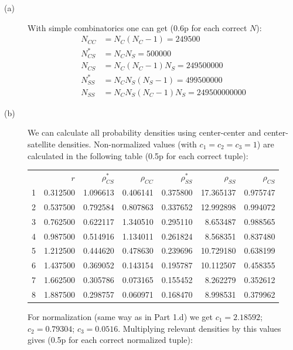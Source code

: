 \begin{description}
\item[(a)] With simple combinatorics one can get (0.6p for each correct
  $N$):
  \begin{align*}
  N_{CC} &= N_C(N_C - 1) = 249500\\
  N^{*}_{CS} &= N_C N_S = 500000\\
  N_{CS} &= N_C(N_C - 1)N_S = 249500000\\
  N^{*}_{SS} &= N_C N_S(N_S - 1) = 499500000\\
  N_{SS} &= N_C N_S(N_C - 1)N_S = 249500000000
  \end{align*}

\item[(b)] We can calculate all probability densities using
  center-center and center-satellite densities. Non-normalized values
  (with $c_1 = c_2 = c_3 = 1$) are calculated in the following table
  (0.5p for each correct tuple):

  \begin{center}
  \begin{tabular}{rrrrrrr}
  & $r$ & $\rho^{*}_{CS}$ & $\rho_{CC}$ & $\rho^{*}_{SS}$
    & $\rho_{SS}$ & $\rho_{CS}$\\
  1 & 0.312500 & 1.096613 & 0.406141 & 0.375800 & 17.365137 & 0.975747\\
  2 & 0.537500 & 0.792584 & 0.807863 & 0.337652 & 12.992898 & 0.994072\\
  3 & 0.762500 & 0.622117 & 1.340510 & 0.295110 & 8.653487 & 0.988565\\
  4 & 0.987500 & 0.514916 & 1.134011 & 0.261824 & 8.568351 & 0.837480\\
  5 & 1.212500 & 0.444620 & 0.478630 & 0.239696 & 10.729180 & 0.638199\\
  6 & 1.437500 & 0.369052 & 0.143154 & 0.195787 & 10.112507 & 0.458355\\
  7 & 1.662500 & 0.305786 & 0.073165 & 0.155452 & 8.262279 & 0.352612\\
  8 & 1.887500 & 0.298757 & 0.060971 & 0.168470 & 8.998531 & 0.379962
  \end{tabular}
  \end{center}

  For normalization (same way as in Part 1.d) we get $c_1 = 2.18592$;
  $c_2 = 0.79304$; $c_3 = 0.0516$. Multiplying relevant densities by
  this values gives (0.5p for each correct normalized tuple):


\end{description}
